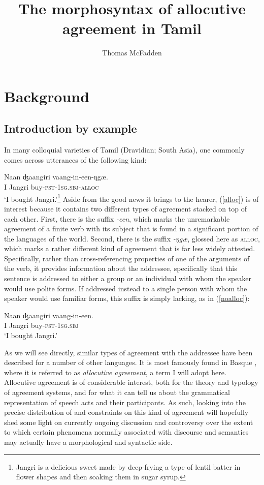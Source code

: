 \documentclass[output=paper, modfonts, nonflat]{langsci/langscibook}
\title{The morphosyntax of allocutive agreement in Tamil}
\author{ Thomas McFadden\affiliation{Leibniz-Zentrum Allgemeine Sprachwissenschaft}}
\begin{document}
\maketitle


\section{Background}

\subsection{Introduction by example}

In many colloquial varieties of Tamil (Dravidian; South Asia), one
commonly comes across utterances of the following kind:

\ea\label{alloc}
\gll Naan ʤaangiri vaang-in-een-ŋgæ.\\
I Jangri buy-\textsc{pst}{}-1\textsc{sg.sbj}-\textsc{alloc}\\
\glt `I bought Jangri.'\footnote{Jangri is a delicious sweet made by
  deep-frying a type of lentil batter in flower shapes and then
  soaking them in sugar syrup.} 
\z 
%
Aside from the good news it brings to the hearer, (\ref{alloc}) is of
interest because it contains two different types of agreement stacked
on top of each other. First, there is the suffix \textit{-een}, which
marks the unremarkable agreement of a finite verb with its subject
that is found in a significant portion of the languages of the
world. Second, there is the suffix \textit{-ŋgæ}, glossed here as
\textsc{alloc}, which marks a rather different kind of agreement that
is far less widely attested. Specifically, rather than
cross-referencing properties of one of the arguments of the verb, it
provides information about the addressee, specifically that this
sentence is addressed to either a group or an individual with whom the
speaker would use polite forms. If addressed instead to a single
person with whom the speaker would use familiar forms, this suffix is
simply lacking, as in (\ref{noalloc}):

\ea\label{noalloc}
\gll Naan ʤaangiri vaang-in-een.\\
I Jangri buy-\textsc{pst}{}-1\textsc{sg.sbj}\\
\glt `I bought Jangri.'
\z 

\noindent As we will see directly, similar types of agreement with the addressee
have been described for a number of other languages. It is most
famously found in Basque \citep{oyharcabal:1993}, where it is referred
to as \textit{allocutive agreement}, a term I will adopt here. Allocutive
agreement is of considerable interest, both for the theory and
typology of agreement systems, and for what it can tell us about the
grammatical representation of speech acts and their participants. As
such, looking into the precise distribution of and constraints on this
kind of agreement will hopefully shed some light on currently ongoing
discussion and controversy over the extent to which certain phenomena
normally associated with discourse and semantics may actually have a
morphological and syntactic side.
\end{document}
